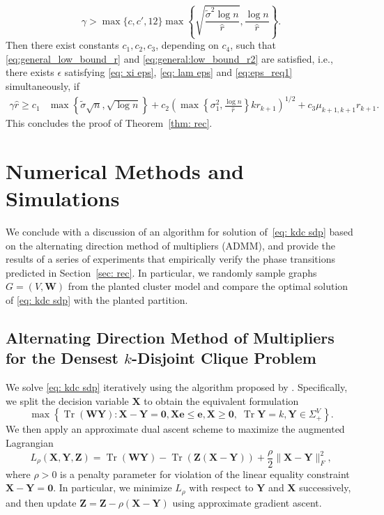 \documentclass[twoside,11pt]{article}
\newcommand{\Z}{\bs{Z}}
\DeclareMathOperator{\tr}{{Tr}}
\newcommand{\e}{\bs {e}}
\newcommand{\bs}{\boldsymbol}
\newcommand{\X}{\bs {X}}
\newcommand{\Y}{\bs {Y}}
\newcommand{\W}{\bs {W}}
\newcommand{\0}{\bs{0}}
\newcommand{\rbra}[1]{\ensuremath{\left( #1 \right)}} %
\newcommand{\bra}[1]{\ensuremath{\left\{ #1 \right\}}} %
\newcommand{\eq}[1]{\(#1\)}
\begin{document}
\[
	\gamma > \max\{c, c', 12\} \max \bra{ \sqrt{  \frac{\tilde \sigma^2 \log n }{\hat r} }, \frac{\log n }{\hat r} }.
\]
Then there exist constants $c_1, c_2, c_3$, depending on $c_4$, such that
\eqref{eq:general_low_bound_r} and \eqref{eq:general:low_bound_r2} are satisfied, i.e., there exists
$\epsilon$ satisfying   \eqref{eq: xi eps}, \eqref{eq: lam eps} and
\eqref{eq:eps_req1}  simultaneously, if
\begin{align*}
	\gamma \hat r  \ge  c_1  &\max\left\lbrace \tilde \sigma\sqrt{n},  \sqrt{\log n} \right\rbrace
			+ c_2 \rbra{ \max \bra{\sigma_1^2, \frac{\log n}{\hat r} } k r_{k+1} }^{1/2} + c_3 \mu_{k+1, k+1} r_{k+1} .
\end{align*}
This concludes the proof of Theorem~\ref{thm: rec}. %

\section{Numerical Methods and Simulations}
\label{sec: num}
We conclude with a discussion of an algorithm for solution of~\eqref{eq: kdc sdp} based on the alternating direction method of multipliers (ADMM),  and provide the results of a series of experiments that empirically verify the phase transitions predicted in Section~\ref{sec: rec}.
In particular, we randomly sample graphs \(G = (V,\W)\) from the planted cluster model and compare the
optimal solution of \eqref{eq: kdc sdp} with the planted partition.

\subsection{Alternating Direction Method of Multipliers for the Densest $k$-Disjoint Clique Problem}
We solve \eqref{eq: kdc sdp} iteratively using the algorithm proposed by \cite{ames2014guaranteed}.
Specifically, we split the decision variable \eq{\X} to obtain the equivalent formulation
\begin{equation} \label{eq: kdc admm}
\max \bra{ \tr(\W\Y) : \X - \Y = \0, \X\e \le \e, \X \ge \0, \; \tr \Y = k, \Y \in \Sigma^V_+ }.
\end{equation}
We then apply an approximate dual ascent scheme to maximize the augmented Lagrangian
\[
L_\rho(\X,\Y,\Z) = \tr(\W\Y) - \tr(\Z(\X-\Y) ) + \frac{\rho}{2} \| \X - \Y\|^2_F,
\]
where \(\rho > 0\) is a penalty parameter for violation of the linear equality constraint  \(\X-\Y = \0\).
In particular, we minimize \(L_\rho\) with respect to \(\Y\) and \(\X\) successively, and then update
\(\Z = \Z - \rho(\X-\Y)\) using approximate gradient ascent.
\end{document}
